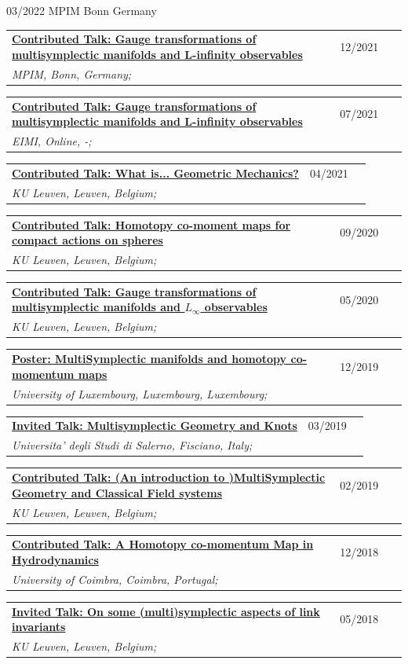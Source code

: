 \documentclass[a4paper]{article}
\newcommand{\longvoice}[8]{
	\begin{tabular}{p{0.83\linewidth} p{0.17\linewidth} }
		\textbf{\href{#3}{#2: #1}} & #4 
		\\ 
		\textit{#5, #6, #7;} & {\small\emph{#8}}
	\end{tabular}
	\vspace{.5em}
}
\begin{document}
		{03/2022}
		{MPIM}
		{Bonn}
		{Germany}
		{}
	\longvoice{Gauge transformations of multisymplectic manifolds and L-infinity observables}
		{Contributed Talk}
		{https://www.dropbox.com/s/x267gvrge9xghq1/2112-Bonn-HigherSeminar.pdf?dl=0}
		{12/2021}
		{MPIM}
		{Bonn}
		{Germany}
		{}
	\longvoice{Gauge transformations of multisymplectic manifolds and L-infinity observables}
		{Contributed Talk}
		{https://www.researchgate.net/publication/353463068_Gauge_transformations_of_multisymplectic_manifolds_and_L_observables}
		{07/2021}
		{EIMI}
		{Online}
		{-}
		{}
	\longvoice{What is... Geometric Mechanics?}
		{Contributed Talk}
		{https://wis.kuleuven.be/agenda/PhdColloquia/ay20-21/copy4_of_PhD-coll-Molag}
		{04/2021}
		{KU Leuven}
		{Leuven}
		{Belgium}
		{}
	\longvoice{Homotopy co-moment maps for compact actions on spheres}
		{Contributed Talk}
		{https://www.researchgate.net/publication/344220375_Homotopy_co-moment_maps_for_compact_actions_on_spheres}
		{09/2020}
		{KU Leuven}
		{Leuven}
		{Belgium}
		{}
	\longvoice{Gauge transformations of multisymplectic manifolds and $L_\infty$ observables}
		{Contributed Talk}
		{https://www.researchgate.net/publication/344044689_Gauge_transformations_of_multisymplectic_manifolds_and_L_infinity_observables}
		{05/2020}
		{KU Leuven}
		{Leuven}
		{Belgium}
		{}
	\longvoice{MultiSymplectic manifolds and homotopy co-momentum maps}
		{Poster}
		{https://www.researchgate.net/publication/338019063_Multisymplectic_manifolds_and_Homotopy_co-momentum_maps}
		{12/2019}
		{University of Luxembourg}
		{Luxembourg}
		{Luxembourg}
		{}
	\longvoice{Multisymplectic Geometry and Knots}
		{Invited Talk}
		{https://www.researchgate.net/publication/331939491_Multisymplectic_aspects_of_link_invariants}
		{03/2019}
		{Universita' degli Studi di Salerno}
		{Fisciano}
		{Italy}
		{}
	\longvoice{(An introduction to )MultiSymplectic Geometry and Classical Field systems}
		{Contributed Talk}
		{https://www.dropbox.com/s/q68uv6hbbej8d09/1902-Talk-MultisymplecticFields.pdf?dl=0}
		{02/2019}
		{KU Leuven}
		{Leuven}
		{Belgium}
		{}
	\longvoice{A Homotopy co-momentum Map in Hydrodynamics}
		{Contributed Talk}
		{https://www.researchgate.net/publication/329572409_Homotopy_co-momentum_Map_in_Hydrodynamics}
		{12/2018}
		{University of Coimbra}
		{Coimbra}
		{Portugal}
		{}
	\longvoice{On some (multi)symplectic aspects of link invariants}
		{Invited Talk}
		{https://web.archive.org/web/20180424133109/https://wis.kuleuven.be/agenda/sem-geometry/academic-year-2017-2018/seminar_differential_geometry_Miti}
		{05/2018}
		{KU Leuven}
		{Leuven}
		{Belgium}
		{}
\end{document}
